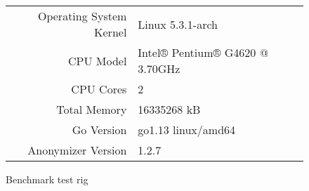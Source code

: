 \begin{figure}[H]
    \centering
    \small
    \begin{tabular}{r l}
        \toprule
        Operating System Kernel        & Linux 5.3.1-arch \\
        CPU Model                      & Intel® Pentium® G4620 @ 3.70GHz \\
        CPU Cores                      & 2 \\
        Total Memory                   & 16335268 kB \\
        Go Version                     & go1.13 linux/amd64 \\
        Anonymizer Version             & 1.2.7 \\
        \bottomrule
    \end{tabular}
    \caption{Benchmark test rig}\label{fig:test_rig}
\end{figure}